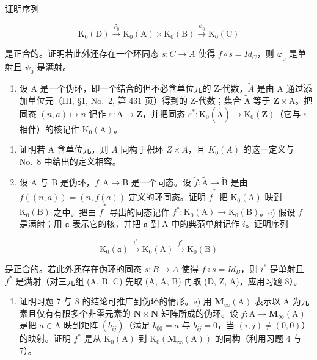 证明序列

\[
\mathrm{K} _ {0} (\mathrm{D}) \xrightarrow {\varphi_ {0}} \mathrm{K} _ {0} (\mathrm{A}) \times \mathrm{K} _ {0} (\mathrm{B}) \xrightarrow {\psi_ {0}} \mathrm{K} _ {0} (\mathrm{C})
\]

是正合的。证明若此外还存在一个环同态 \(s: C \to A\) 使得 \(f \circ s = Id_{C}\)，则 \(\varphi_{0}\) 是单射且 \(\psi_{0}\) 是满射。

\begin{enumerate}
\def\labelenumi{\arabic{enumi})}
\setcounter{enumi}{8}
\tightlist
\item
  设 A 是一个伪环，即一个结合的但不必含单位元的 Z-代数，\(\widetilde{A}\) 是由 A 通过添加单位元（III, §1, No.~2, 第 431 页）得到的 Z-代数；集合 \(\widetilde{\mathrm{A}}\) 等于 \(\mathbf{Z} \times \mathrm{A}\)。把同态 \((n, a) \mapsto n\) 记作 \(\varepsilon : \widetilde{\mathrm{A}} \to \mathbf{Z}\)，并把同态 \(\varepsilon^{*} : \mathrm{K}_{0}(\widetilde{\mathrm{A}}) \to \mathrm{K}_{0}(\mathbf{Z})\)（它与 \(\varepsilon\) 相伴）的核记作 \(\mathrm{K}_{0}(\mathrm{A})\)。
\end{enumerate}

\begin{enumerate}
\def\labelenumi{\alph{enumi})}
\item
  证明若 A 含单位元，则 \(\tilde{A}\) 同构于积环 \(Z \times A\)，且 \(K_{0}(A)\) 的这一定义与 No.~8 中给出的定义相容。
\item
  设 A 与 B 是伪环，\(f: \mathrm{A} \to \mathrm{B}\) 是一个同态。设 \(\widetilde{f}: \widetilde{\mathrm{A}} \to \widetilde{\mathrm{B}}\) 是由 \(\widetilde{f}((n, a)) = (n, f(a))\) 定义的环同态。证明 \(\widetilde{f}^*\) 把 \(\mathrm{K}_0(\mathrm{A})\) 映到 \(\mathrm{K}_0(\mathrm{B})\) 之中。把由 \(\widetilde{f}^*\) 导出的同态记作 \(f^*: \mathrm{K}_0(\mathrm{A}) \to \mathrm{K}_0(\mathrm{B})\)。c) 假设 \(f\) 是满射；用 \(\mathfrak{a}\) 表示它的核，并把 \(\mathfrak{a}\) 到 A 中的典范单射记作 \(i\)。证明序列
\end{enumerate}

\[
\mathrm{K} _ {0} (\mathfrak {a}) \xrightarrow {i ^ {*}} \mathrm{K} _ {0} (\mathrm{A}) \xrightarrow {f ^ {*}} \mathrm{K} _ {0} (\mathrm{B})
\]

是正合的。若此外还存在伪环的同态 \(s: B \to A\) 使得 \(f \circ s = Id_{B}\)，则 \(i^{*}\) 是单射且 \(f^{*}\) 是满射（对三元组 (A, B, C) 先取 (A, A, B) 再取 (D, Z, A)，应用习题 8）。

\begin{enumerate}
\def\labelenumi{\alph{enumi})}
\setcounter{enumi}{3}
\tightlist
\item
  证明习题 7 与 8 的结论可推广到伪环的情形。e) 用 \(\mathbf{M}_{\infty}(\mathrm{A})\) 表示以 A 为元素且仅有有限多个非零元素的 \(\mathbf{N} \times \mathbf{N}\) 矩阵所成的伪环。设 \(f: \mathrm{A} \to \mathbf{M}_{\infty}(\mathrm{A})\) 是把 \(a \in \mathrm{A}\) 映到矩阵 \((b_{ij})\)（满足 \(b_{00} = a\) 与 \(b_{ij} = 0\)，当 \((i,j) \neq (0,0)\)）的映射。证明 \(f^{*}\) 是从 \(\mathrm{K}_0(\mathrm{A})\) 到 \(\mathrm{K}_0(\mathbf{M}_{\infty}(\mathrm{A}))\) 的同构（利用习题 4 与 7）。
\end{enumerate}

